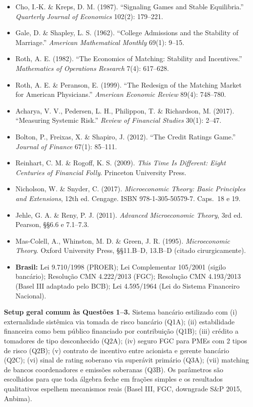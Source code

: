 \documentclass[11pt,addpoints]{exam}
\begin{document}
\begin{contextbox}
\begin{itemize}[noitemsep,topsep=0pt]
\item Cho, I.-K. \& Kreps, D. M. (1987). ``Signaling Games and Stable Equilibria.'' \textit{Quarterly Journal of Economics} 102(2): 179--221.
\item Gale, D. \& Shapley, L. S. (1962). ``College Admissions and the Stability of Marriage.'' \textit{American Mathematical Monthly} 69(1): 9--15.
\item Roth, A. E. (1982). ``The Economics of Matching: Stability and Incentives.'' \textit{Mathematics of Operations Research} 7(4): 617--628.
\item Roth, A. E. \& Peranson, E. (1999). ``The Redesign of the Matching Market for American Physicians.'' \textit{American Economic Review} 89(4): 748--780.
\item Acharya, V. V., Pedersen, L. H., Philippon, T. \& Richardson, M. (2017). ``Measuring Systemic Risk.'' \textit{Review of Financial Studies} 30(1): 2--47.
\item Bolton, P., Freixas, X. \& Shapiro, J. (2012). ``The Credit Ratings Game.'' \textit{Journal of Finance} 67(1): 85--111.
\item Reinhart, C. M. \& Rogoff, K. S. (2009). \textit{This Time Is Different: Eight Centuries of Financial Folly}. Princeton University Press.
\item Nicholson, W. \& Snyder, C. (2017). \textit{Microeconomic Theory: Basic Principles and Extensions}, 12th ed. Cengage. ISBN 978-1-305-50579-7. Caps.~18 e 19.
\item Jehle, G. A. \& Reny, P. J. (2011). \textit{Advanced Microeconomic Theory}, 3rd ed. Pearson, §§6.6 e 7.1--7.3.
\item Mas-Colell, A., Whinston, M. D. \& Green, J. R. (1995). \textit{Microeconomic Theory}. Oxford University Press, §§11.B--D, 13.B--D (citado cirurgicamente).
\item \textbf{Brasil:} Lei 9.710/1998 (PROER); Lei Complementar 105/2001 (sigilo bancário); Resolução CMN 4.222/2013 (FGC); Resolução CMN 4.193/2013 (Basel III adaptado pelo BCB); Lei 4.595/1964 (Lei do Sistema Financeiro Nacional).
\end{itemize}
\end{contextbox}

\vspace{0.5em}

\noindent\textbf{Setup geral comum às Questões 1--3.} Sistema bancário estilizado com (i) externalidade sistêmica via tomada de risco bancário (Q1A); (ii) estabilidade financeira como bem público financiado por contribuição (Q1B); (iii) crédito a tomadores de tipo desconhecido (Q2A); (iv) seguro FGC para PMEs com 2 tipos de risco (Q2B); (v) contrato de incentivo entre acionista e gerente bancário (Q2C); (vi) sinal de rating soberano via superávit primário (Q3A); (vii) matching de bancos coordenadores e emissões soberanas (Q3B). Os parâmetros são escolhidos para que toda álgebra feche em frações simples e os resultados qualitativos espelhem mecanismos reais (Basel III, FGC, downgrade S\&P 2015, Anbima).
\end{document}
